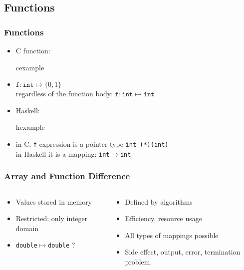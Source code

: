 
\subsection{Functions}
\begin{frame}
 \frametitle{Functions}
\begin{itemize}
 \item C function:
\begin{beamercolorbox}{cexample}
\codefonkesC
\end{beamercolorbox}
\item $\mathtt{f}:\mathtt{int} \mapsto \{0,1\}$\\
	regardless of the function body: $\mathtt{f}:\mathtt{int} \mapsto \mathtt{int}$
\item Haskell:
\begin{beamercolorbox}{hexample}
\codefonkesH
\end{beamercolorbox}
\item in C, \texttt{f} expression is a pointer type
	\mbox{\texttt{int (*)(int)}}\\
	in Haskell it is a mapping: \mbox{\texttt{int$\mapsto$int}}
\end{itemize}
\end{frame}

\begin{frame}
 \frametitle{Array and Function Difference}
  \begin{columns}
   \begin{column}{.5\textwidth}
	\begin{itemize}
	 \item Values stored in memory
	 \item Restricted: only integer domain
	 \item \texttt{double$\mapsto$double} ?
	\end{itemize}
   \end{column}
   \begin{column}{.5\textwidth}
	\begin{itemize}
	 \item Defined by  algorithms
	 \item Efficiency, resource usage
	 \item All types of mappings possible
	 \item Side effect, output, error, termination problem.
	\end{itemize}
   \end{column}
  \end{columns}
\end{frame}

